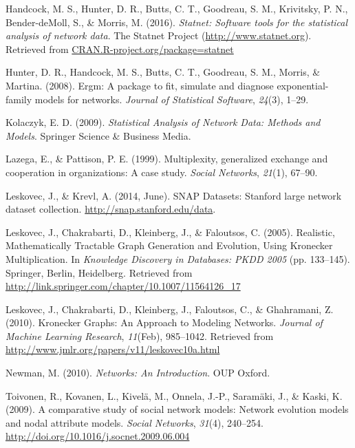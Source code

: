 \documentclass[12pt,twoside]{amherstthesis}
\begin{document}
  \hypertarget{ref-statnetpackagemanual}{}
  Handcock, M. S., Hunter, D. R., Butts, C. T., Goodreau, S. M.,
  Krivitsky, P. N., Bender-deMoll, S., \& Morris, M. (2016).
  \emph{Statnet: Software tools for the statistical analysis of network
  data}. The Statnet Project (\url{http://www.statnet.org}). Retrieved
  from \url{CRAN.R-project.org/package=statnet}
  
  \hypertarget{ref-ergmpackagearticle}{}
  Hunter, D. R., Handcock, M. S., Butts, C. T., Goodreau, S. M., Morris,
  \& Martina. (2008). Ergm: A package to fit, simulate and diagnose
  exponential-family models for networks. \emph{Journal of Statistical
  Software}, \emph{24}(3), 1--29.
  
  \hypertarget{ref-kolaczyk_statistical_2009}{}
  Kolaczyk, E. D. (2009). \emph{Statistical Analysis of Network Data:
  Methods and Models}. Springer Science \& Business Media.
  
  \hypertarget{ref-lazega1999multiplexity}{}
  Lazega, E., \& Pattison, P. E. (1999). Multiplexity, generalized
  exchange and cooperation in organizations: A case study. \emph{Social
  Networks}, \emph{21}(1), 67--90.
  
  \hypertarget{ref-snapnets}{}
  Leskovec, J., \& Krevl, A. (2014, June). SNAP Datasets: Stanford large
  network dataset collection. \url{http://snap.stanford.edu/data}.
  
  \hypertarget{ref-leskovec_realistic_2005}{}
  Leskovec, J., Chakrabarti, D., Kleinberg, J., \& Faloutsos, C. (2005).
  Realistic, Mathematically Tractable Graph Generation and Evolution,
  Using Kronecker Multiplication. In \emph{Knowledge Discovery in
  Databases: PKDD 2005} (pp. 133--145). Springer, Berlin, Heidelberg.
  Retrieved from
  \url{http://link.springer.com/chapter/10.1007/11564126_17}
  
  \hypertarget{ref-leskovec_kronecker_2010}{}
  Leskovec, J., Chakrabarti, D., Kleinberg, J., Faloutsos, C., \&
  Ghahramani, Z. (2010). Kronecker Graphs: An Approach to Modeling
  Networks. \emph{Journal of Machine Learning Research}, \emph{11}(Feb),
  985--1042. Retrieved from
  \url{http://www.jmlr.org/papers/v11/leskovec10a.html}
  
  \hypertarget{ref-newman_networks:_2010}{}
  Newman, M. (2010). \emph{Networks: An Introduction}. OUP Oxford.
  
  \hypertarget{ref-toivonen_comparative_2009}{}
  Toivonen, R., Kovanen, L., Kivelä, M., Onnela, J.-P., Saramäki, J., \&
  Kaski, K. (2009). A comparative study of social network models: Network
  evolution models and nodal attribute models. \emph{Social Networks},
  \emph{31}(4), 240--254.
  \url{http://doi.org/10.1016/j.socnet.2009.06.004}
  
\end{document}
